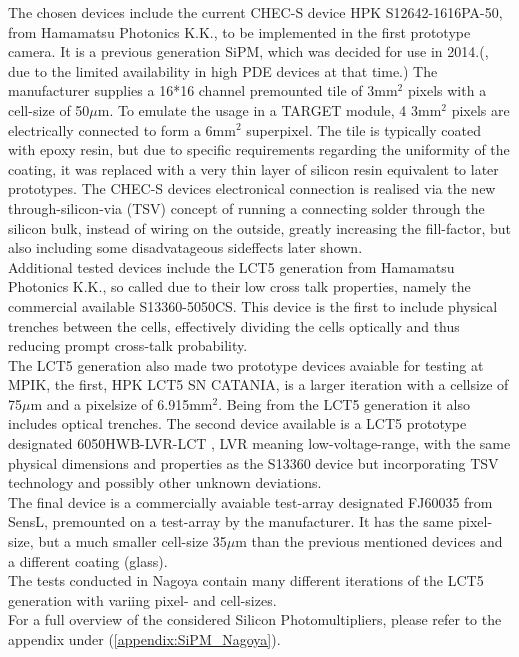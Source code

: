 \documentclass[12pt,article,type=msc,colorback,accentcolor=tud9c]{tudthesis}
\begin{document}
The chosen devices include the current CHEC-S device HPK S12642-1616PA-50, from Hamamatsu Photonics K.K., to be implemented in the first prototype camera. It is a previous generation SiPM, which was decided for use in 2014.(, due to the limited availability in high PDE devices at that time.) The manufacturer supplies a 16*16 channel premounted tile of 3mm$^2$ pixels with a cell-size of 50$\mu$m. To emulate the usage in a TARGET module, 4 3mm$^2$ pixels are electrically connected to form a 6mm$^2$ superpixel. The tile is typically coated with epoxy resin, but due to specific requirements regarding the uniformity of the coating, it was replaced with a very thin layer of silicon resin equivalent to later prototypes. The CHEC-S devices electronical connection is realised via the new through-silicon-via (TSV) concept of running a connecting solder through the silicon bulk, instead of wiring on the outside, greatly increasing the fill-factor, but also including some disadvatageous sideffects later shown.\\
Additional tested devices include the LCT5 generation from Hamamatsu Photonics K.K., so called due to their low cross talk properties, namely the commercial available S13360-5050CS. This device is the first to include physical trenches between the cells, effectively dividing the cells optically and thus reducing prompt cross-talk probability.\\
The LCT5 generation also made two prototype devices avaiable for testing at MPIK, the first, HPK LCT5 SN CATANIA, is a larger iteration with a cellsize of 75$\mu$m and a pixelsize of 6.915mm$^2$. Being from the LCT5 generation it also includes optical trenches. The second device available is a LCT5 prototype designated 6050HWB-LVR-LCT , LVR meaning low-voltage-range, with the same physical dimensions and properties as the S13360 device but incorporating TSV technology and possibly other unknown deviations.\\
The final device is a commercially avaiable test-array designated FJ60035 from SensL, premounted on a test-array by the manufacturer. It has the same pixel-size, but a much smaller cell-size 35$\mu$m than the previous mentioned devices and a different coating (glass).\\

The tests conducted in Nagoya contain many different iterations of the LCT5 generation with variing pixel- and cell-sizes.\\
For a full overview of the considered Silicon Photomultipliers, please refer to the appendix under (\ref{appendix:SiPM_Nagoya}).
\end{document}
